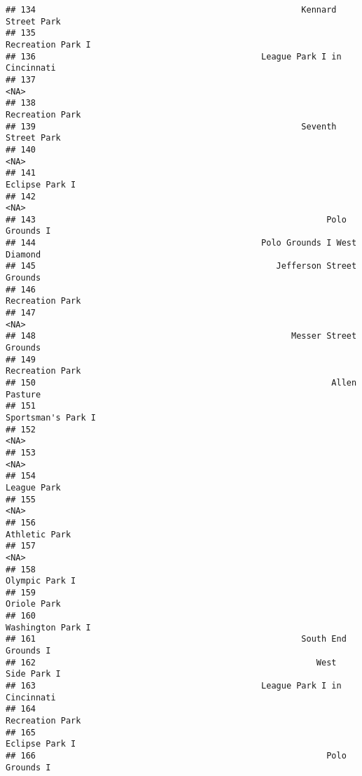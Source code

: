 \documentclass[]{article}
\begin{document}
\begin{verbatim}
## 134                                                     Kennard Street Park
## 135                                                       Recreation Park I
## 136                                             League Park I in Cincinnati
## 137                                                                    <NA>
## 138                                                         Recreation Park
## 139                                                     Seventh Street Park
## 140                                                                    <NA>
## 141                                                          Eclipse Park I
## 142                                                                    <NA>
## 143                                                          Polo Grounds I
## 144                                             Polo Grounds I West Diamond
## 145                                                Jefferson Street Grounds
## 146                                                         Recreation Park
## 147                                                                    <NA>
## 148                                                   Messer Street Grounds
## 149                                                         Recreation Park
## 150                                                           Allen Pasture
## 151                                                      Sportsman's Park I
## 152                                                                    <NA>
## 153                                                                    <NA>
## 154                                                             League Park
## 155                                                                    <NA>
## 156                                                           Athletic Park
## 157                                                                    <NA>
## 158                                                          Olympic Park I
## 159                                                             Oriole Park
## 160                                                       Washington Park I
## 161                                                     South End Grounds I
## 162                                                        West Side Park I
## 163                                             League Park I in Cincinnati
## 164                                                         Recreation Park
## 165                                                          Eclipse Park I
## 166                                                          Polo Grounds I

\end{verbatim}
\end{document}

